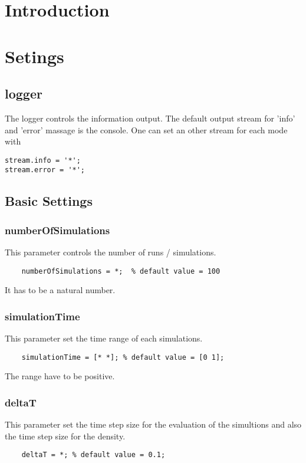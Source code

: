 \documentclass[12pt,a4paper]{article}
\begin{document}
	
\section{Introduction}
	
\section{Setings}	

\subsection{logger}

The logger controls the information output. The default output stream for 'info' and 'error' massage is the console. One can set an other stream for each mode with
\begin{lstlisting}
stream.info = '*';
stream.error = '*';
\end{lstlisting} 

\subsection{Basic Settings}
\subsubsection*{numberOfSimulations}
This parameter controls the number of runs / simulations.
\begin{lstlisting}
	numberOfSimulations = *;  % default value = 100
\end{lstlisting}
It has to be a natural number.

\subsubsection*{simulationTime}
This parameter set the time range of each simulations. 
\begin{lstlisting}
	simulationTime = [* *]; % default value = [0 1]; 
\end{lstlisting}
The range have to be positive.
\subsubsection*{deltaT}
This parameter set the time step size for the evaluation of the simultions and also the time step size for the density. 

\begin{lstlisting}
	deltaT = *; % default value = 0.1;
\end{lstlisting}
\end{document}
